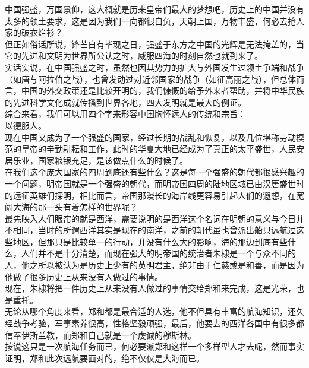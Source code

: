 \begin{multicols}{\theparacolNo}
中国强盛，万国景仰，这大概就是历来皇帝们最大的梦想吧，历史上的中国并没有太多的领土要求，这是因为我们一向都很自负，天朝上国，万物丰盛，何必去抢人家的破衣烂衫？\\

但正如俗话所说，锋芒自有毕现之日，强盛于东方之中国的光辉是无法掩盖的，当它的先进和文明为世界所公认之时，威服四海的时刻自然也就到来了。\\

实话实说，在中国强盛之时，虽然也因其势力的扩大与外国发生过领土争端和战争（如唐与阿拉伯之战），也曾发动过对近邻国家的战争（如征高丽之战），但总体而言，中国的外交政策还是比较开明的，我们慷慨的给予外来者帮助，并将中华民族的先进科学文化成就传播到世界各地，四大发明就是最大的例证。\\

综合来看，我们可以用四个字来形容中国胸怀远人的传统和宗旨：\\

以德服人。\\

现在中国又成为了一个强盛的国家，经过长期的战乱和恢复，以及几位堪称劳动模范的皇帝的辛勤耕耘和工作，此时的华夏大地已经成为了真正的太平盛世，人民安居乐业，国家粮银充足，是该做点什么的时候了。\\

在我们这个庞大国家的四周到底还有些什么？这是每一个强盛的朝代都很感兴趣的一个问题，明帝国就是一个强盛的朝代，而明帝国四周的陆地区域已由汉唐盛世时的远征英雄们探明，相比而言，帝国那漫长的海岸线更容易引起人们的遐想，在宽阔大海的那一头有着怎样的世界呢？\\

最先映入人们眼帘的就是西洋，需要说明的是西洋这个名词在明朝的意义与今日并不相同，当时的所谓西洋其实是现在的南洋，之前的朝代虽也曾派出船只远航过这些地区，但那只是比较单一的行动，并没有什么大的影响，海的那边到底有些什么，人们并不是十分清楚，而现在强大的明帝国的统治者朱棣是一个与众不同的人，他之所以被认为是历史上少有的英明君主，绝非由于仁慈或是和善，而是因为他做了很多历史上从来没有人做过的事情。\\

现在，朱棣将把一件历史上从来没有人做过的事情交给郑和来完成，这是光荣，也是重托。\\

无论从哪个角度来看，郑和都是最合适的人选，他不但具有丰富的航海知识，还久经战争考验，军事素养很高，性格坚毅顽强，最后，他要去的西洋各国中有很多都信奉伊斯兰教，而郑和自己就是一个虔诚的穆斯林。\\

按说这只是一次航海任务而已，何必要派郑和这样一个多样型人才去呢，然而事实证明，郑和此次远航要面对的，绝不仅仅是大海而已。\\


\end{multicols}
